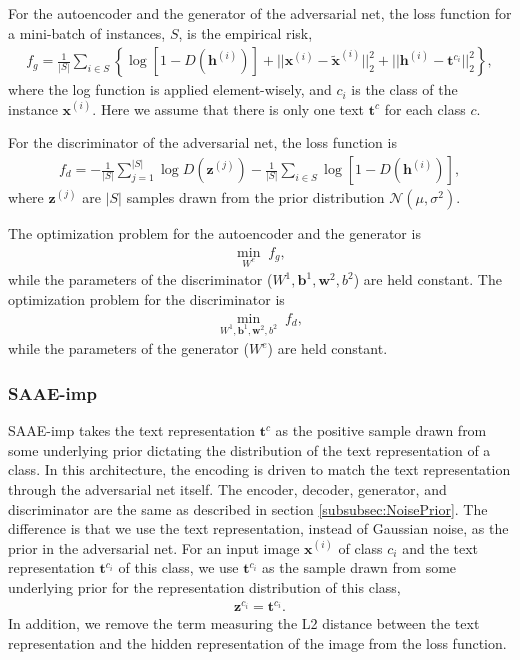 \documentclass{article}
\newcommand{\bb}[1]{\boldsymbol{#1}}
\begin{document}
	For the autoencoder and the generator of the adversarial net, the loss function for a mini-batch of instances, $S$, is the empirical risk,
	\begin{align}
		f_g = \frac{1}{|S|} \sum_{i \in S} \left\{ \log\left[ 1 - D( \bb{h}^{(i)} ) \right] + || \bb{x}^{(i)} - \tilde{\bb{x}}^{(i)} ||_2^2 + || \bb{h}^{(i)} - \bb{t}^{c_i} ||_2^2 \right\},
	\end{align}
	where the log function is applied element-wisely, and $c_i$ is the class of the instance $\bb{x}^{(i)}$. Here we assume that there is only one text $\bb{t}^c$ for each class $c$.

	For the discriminator of the adversarial net, the loss function is
	\begin{align}
		f_d = -\frac{1}{|S|} \sum_{j = 1}^{|S|} \log D( \bb{z}^{(j)} ) - \frac{1}{|S|} \sum_{i \in S} \log\left[ 1 - D( \bb{h}^{(i)} ) \right],
	\end{align}
	where $\bb{z}^{(j)}$ are $|S|$ samples drawn from the prior distribution $\mathcal{N}(\mu, \sigma^2)$.
	
	The optimization problem for the autoencoder and the generator is
	\begin{align}
		\min_{W^e} \; f_g,
	\end{align}
	while the parameters of the discriminator ($W^1, \bb{b}^1, \bb{w}^2, b^2$) are held constant. The optimization problem for the discriminator is
	\begin{align}
		\min_{W^1, \bb{b}^1, \bb{w}^2, b^2} \; f_d,
	\end{align}
	while the parameters of the generator ($W^e$) are held constant.



\subsubsection{SAAE-imp}
\label{subsubsec:TextPrior}
	
	SAAE-imp takes the text representation $\bb{t}^c$ as the positive sample drawn from some underlying prior dictating the distribution of the text representation of a class. In this architecture, the encoding is driven to match the text representation through the adversarial net itself. The encoder, decoder, generator, and discriminator are the same as described in section \ref{subsubsec:NoisePrior}. The difference is that we use the text representation, instead of Gaussian noise, as the prior in the adversarial net. For an input image $\bb{x}^{(i)}$ of class $c_i$ and the text representation $\bb{t}^{c_i}$ of this class, we use $\bb{t}^{c_i}$ as the sample drawn from some underlying prior for the representation distribution of this class,
	\begin{align}
		\bb{z}^{c_i} = \bb{t}^{c_i}.
	\end{align}
	In addition, we remove the term measuring the L2 distance between the text representation and the hidden representation of the image from the loss function.
\end{document}
